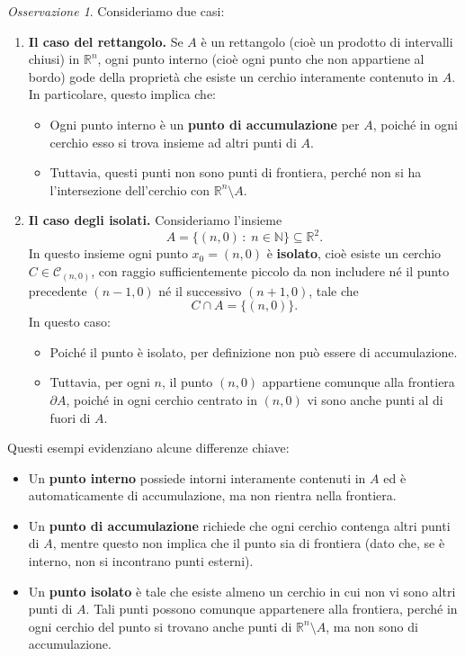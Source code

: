 \documentclass{article}
\theoremstyle{plain}
\theoremstyle{definition}
\theoremstyle{remark}
\newtheorem{rem}{Osservazione}
\begin{document}
\begin{rem}
Consideriamo due casi:
\begin{enumerate}
    \item \textbf{Il caso del rettangolo.}  
    Se $A$ è un rettangolo (cioè un prodotto di intervalli chiusi) in $\mathbb{R}^n$, ogni punto interno (cioè ogni punto che non appartiene al bordo) gode della proprietà che esiste un cerchio interamente contenuto in $A$.  
    In particolare, questo implica che:
    \begin{itemize}
        \item Ogni punto interno è un \textbf{punto di accumulazione} per $A$, poiché in ogni cerchio esso si trova insieme ad altri punti di $A$.
        \item Tuttavia, questi punti non sono punti di frontiera, perché non si ha l'intersezione dell'cerchio con $\mathbb{R}^n\setminus A$.
    \end{itemize}

    \item \textbf{Il caso degli isolati.}  
    Consideriamo l'insieme 
    \[
    A=\{(n,0)\,:\;n\in\mathbb{N}\}\subseteq\mathbb{R}^2.
    \]
    In questo insieme ogni punto $x_0=(n,0)$ è \textbf{isolato}, cioè esiste un cerchio $C\in\mathcal{C}_{(n,0)}$, con raggio sufficientemente piccolo da non includere né il punto precedente $(n-1,0)$ né il successivo $(n+1,0)$, tale che
    \[
    C\cap A=\{(n,0)\}.
    \]
    In questo caso:
    \begin{itemize}
        \item Poiché il punto è isolato, per definizione non può essere di accumulazione.
        \item Tuttavia, per ogni $n$, il punto $(n,0)$ appartiene comunque alla frontiera $\partial A$, poiché in ogni cerchio centrato in $(n,0)$ vi sono anche punti al di fuori di $A$. 
    \end{itemize}
\end{enumerate}

Questi esempi evidenziano alcune differenze chiave:
\begin{itemize}
    \item Un \textbf{punto interno} possiede intorni interamente contenuti in $A$ ed è automaticamente di accumulazione, ma non rientra nella frontiera.
    \item Un \textbf{punto di accumulazione} richiede che ogni cerchio contenga altri punti di $A$, mentre questo non implica che il punto sia di frontiera (dato che, se è interno, non si incontrano punti esterni).
    \item Un \textbf{punto isolato} è tale che esiste almeno un cerchio in cui non vi sono altri punti di $A$. Tali punti possono comunque appartenere alla frontiera, perché in ogni cerchio del punto si trovano anche punti di $\mathbb{R}^n\setminus A$, ma non sono di accumulazione.
\end{itemize}
\end{rem}
\end{document}
